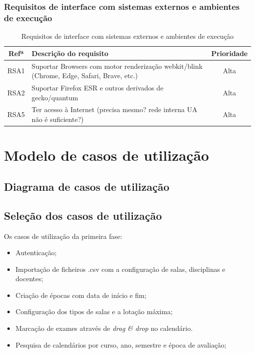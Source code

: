 \documentclass[11pt, twoside]{report}
\begin{document}
	\subsection{Requisitos de interface com sistemas externos e ambientes de execução}
	
	
	
	
	\begin{table}[H]
		\caption{Requisitos de interface com sistemas externos e ambientes de execução}
		\begin{center}
			\begin{tabularx}{\textwidth}{|c|X|c|}
				\hline
				\textbf{Refª }	& \textbf{Descrição do requisito} & \textbf{Prioridade}\\
				\hline
				RSA1 & Suportar Browsers com motor renderização webkit/blink (Chrome, Edge, Safari, Brave, etc.)  & Alta \\
				\hline
				RSA2 & Suportar Firefox ESR e outros derivados de gecko/quantum & Alta \\
				\hline
				RSA5 & Ter acesso à Internet (precisa mesmo? rede interna UA não é suficiente?) & Alta\\
				\hline
			\end{tabularx}
			\label{requisitosdesistemas}
		\end{center}
	\end{table}
		
	
	\chapter{Modelo de casos de utilização}
	\section{Diagrama de casos de utilização}
	\section{Seleção dos casos de utilização}
	
	Os casos de utilização da primeira fase:
	
	\begin{itemize}
		\item Autenticação;
		\item Importação de ficheiros .csv com a configuração de salas, disciplinas e docentes;
	 	\item Criação de épocas com data de início e fim;
	 	\item Configuração dos tipos de salas e a lotação máxima;
	 	\item Marcação de exames através de \textit{drag \& drop}  no calendário.
	 	\item Pesquisa de calendários por curso, ano, semestre e época de avaliação;
	\end{itemize}
	
\end{document}
